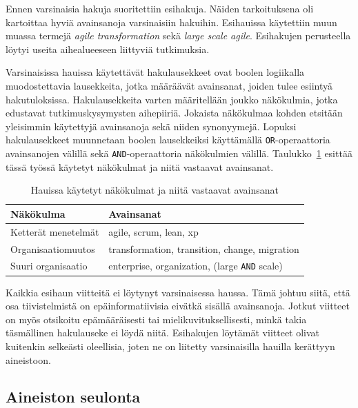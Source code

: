 Ennen varsinaisia hakuja suoritettiin esihakuja. Näiden tarkoituksena oli
kartoittaa hyviä avainsanoja varsinaisiin hakuihin. Esihauissa käytettiin muun
muassa termejä \textit{agile transformation} sekä \textit{large scale agile}.
Esihakujen perusteella löytyi useita aihealueeseen liittyviä tutkimuksia.

Varsinaisissa hauissa käytettävät hakulausekkeet ovat boolen logiikalla
muodostettavia lausekkeita, jotka määräävät avainsanat, joiden tulee esiintyä
hakutuloksissa. Hakulausekkeita varten määritellään joukko näkökulmia, jotka
edustavat tutkimuskysymysten aihepiiriä. Jokaista näkökulmaa kohden etsitään
yleisimmin käytettyjä avainsanoja sekä niiden synonyymejä. Lopuksi
hakulausekkeet muunnetaan boolen lausekkeiksi käyttämällä
\texttt{OR}-operaattoria avainsanojen välillä sekä \texttt{AND}-operaattoria
näkökulmien välillä. Taulukko~\ref{table:hakulausekkeet} esittää tässä työssä
käytetyt näkökulmat ja niitä vastaavat avainsanat.

\begin{table}[h]
    \begin{tabular}{|l|l|}
        \hline
        Näkökulma           & Avainsanat   \\ \hline
        Ketterät menetelmät & agile, scrum, lean, xp \\ 
        Organisaatiomuutos  & transformation, transition, change, migration \\
        Suuri organisaatio  & enterprise, organization, (large \texttt{AND} scale) \\
        \hline
    \end{tabular}
	\caption{Hauissa käytetyt näkökulmat ja niitä vastaavat avainsanat}
	\label{table:hakulausekkeet}
\end{table}

Kaikkia esihaun viitteitä ei löytynyt varsinaisessa haussa. Tämä johtuu siitä,
että osa tiivistelmistä on epäinformatiivisia eivätkä sisällä avainsanoja.
Jotkut viitteet on myös otsikoitu epämääräisesti tai mielikuvituksellisesti,
minkä takia täsmällinen hakulauseke ei löydä niitä. Esihakujen löytämät
viitteet olivat kuitenkin selkeästi oleellisia, joten ne on liitetty
varsinaisilla hauilla kerättyyn aineistoon.

\subsection{Aineiston seulonta}

